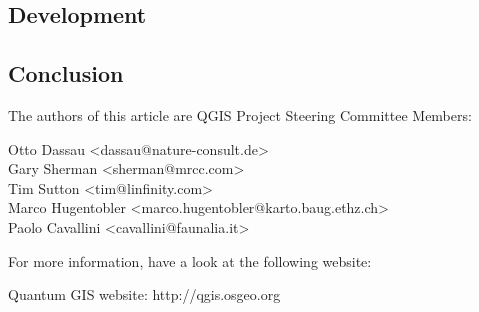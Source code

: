 \subsection{Development}

\subsection{Conclusion}


The authors of this article are QGIS Project Steering Committee Members:

Otto Dassau <dassau@nature-consult.de>  
\\Gary Sherman <sherman@mrcc.com>
\\Tim Sutton <tim@linfinity.com>
\\Marco Hugentobler <marco.hugentobler@karto.baug.ethz.ch>
\\Paolo Cavallini <cavallini@faunalia.it>


For more information, have a look at the following website:

Quantum GIS website: http://qgis.osgeo.org



 



